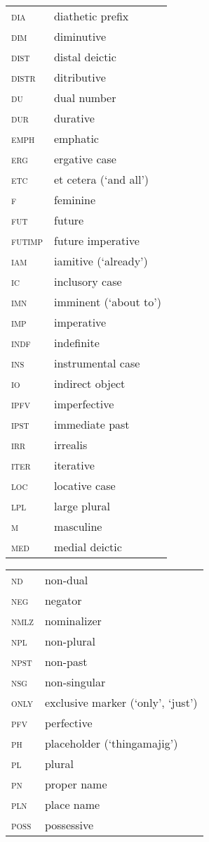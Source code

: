 \begin{tabularx}{.45\textwidth}{lQ}
    \textsc{dia} & diathetic prefix\\
    \textsc{dim} & diminutive\\
    \textsc{dist} & distal deictic\\
    \textsc{distr} & ditributive\\
    \textsc{du} & dual number\\
    \textsc{dur} & durative\\
    \textsc{emph} & emphatic\\
    \textsc{erg} & ergative case\\
    \textsc{etc} & et cetera (`and all')\\
    \textsc{f} & feminine\\
    \textsc{fut} & future\\
    \textsc{futimp} & future imperative\\
    \textsc{iam} & iamitive (`already')\\
    \textsc{ic} & inclusory case\\
    \textsc{imn} & imminent (`about to')\\
    \textsc{imp} & imperative\\
    \textsc{indf} & indefinite\\
    \textsc{ins} & instrumental case\\
    \textsc{io} & indirect object\\
    \textsc{ipfv} & imperfective\\
    \textsc{ipst} & immediate past\\
    \textsc{irr} & irrealis\\
    \textsc{iter} & iterative\\
    \textsc{loc} & locative case\\
    \textsc{lpl} & large plural\\
    \textsc{m} & masculine\\
    \textsc{med} & medial deictic\\
\end{tabularx}
\newpage
\begin{tabularx}{.45\textwidth}{lQ}
    \textsc{nd} & non-dual\\
    \textsc{neg} & negator\\
    \textsc{nmlz} & nominalizer\\
    \textsc{npl} & non-plural\\
	\textsc{npst} & non-past\\
	\textsc{nsg} & non-singular\\
    \textsc{only} & exclusive marker (`only', `just')\\
    \textsc{pfv} & perfective\\
    \textsc{ph} & placeholder (`thingamajig')\\
    \textsc{pl} & plural\\
    \textsc{pn} & proper name\\
    \textsc{pln} & place name\\
    \textsc{poss} & possessive\\
\end{tabularx}
